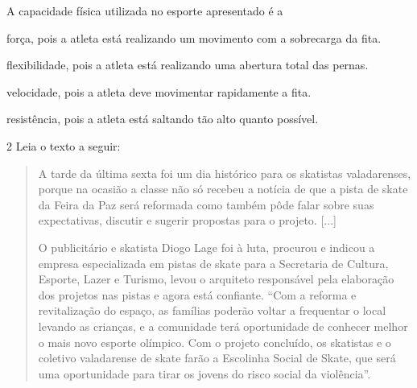 A capacidade física utilizada no esporte apresentado é a

\begin{escolha}
\item força, pois a atleta está realizando um movimento com a sobrecarga da fita.

\item flexibilidade, pois a atleta está realizando uma abertura total das
pernas.

\item velocidade, pois a atleta deve movimentar rapidamente a fita.

\item resistência, pois a atleta está saltando tão alto quanto possível.
\end{escolha}


\num{2} Leia o texto a seguir:

\begin{quote}
A tarde da última sexta foi um dia histórico para os skatistas
valadarenses, porque na ocasião a classe não só recebeu a notícia de
que a pista de skate da Feira da Paz será reformada como também pôde
falar sobre suas expectativas, discutir e sugerir propostas para o
projeto. {[}...{]}

O publicitário e skatista Diogo Lage foi à luta, procurou e indicou a
empresa especializada em pistas de skate para a Secretaria de Cultura, Esporte, Lazer e Turismo, levou o
arquiteto responsável pela elaboração dos projetos nas pistas e agora
está confiante. ``Com a reforma e revitalização do espaço, as famílias
poderão voltar a frequentar o local levando as crianças, e a comunidade
terá oportunidade de conhecer melhor o mais novo esporte olímpico. Com o
projeto concluído, os skatistas e o coletivo valadarense de skate farão a
Escolinha Social de Skate, que será uma oportunidade para tirar os
jovens do risco social da violência''.

\end{quote}

